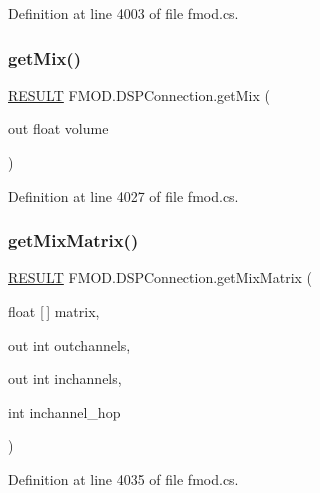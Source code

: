 Definition at line 4003 of file fmod.\+cs.

\mbox{\label{class_f_m_o_d_1_1_d_s_p_connection_a4eca6c02444348f52dde8838376a2ee3}} 
\subsubsection{\texorpdfstring{get\+Mix()}{getMix()}}
{\footnotesize\ttfamily \hyperlink{namespace_f_m_o_d_a305d1176ef3f8c8815861a60407ac33d}{R\+E\+S\+U\+LT} F\+M\+O\+D.\+D\+S\+P\+Connection.\+get\+Mix (\begin{DoxyParamCaption}\item[{out float}]{volume }\end{DoxyParamCaption})}



Definition at line 4027 of file fmod.\+cs.

\mbox{\label{class_f_m_o_d_1_1_d_s_p_connection_ac6795f09bd1fff01d2226b2abb1fe267}} 
\subsubsection{\texorpdfstring{get\+Mix\+Matrix()}{getMixMatrix()}}
{\footnotesize\ttfamily \hyperlink{namespace_f_m_o_d_a305d1176ef3f8c8815861a60407ac33d}{R\+E\+S\+U\+LT} F\+M\+O\+D.\+D\+S\+P\+Connection.\+get\+Mix\+Matrix (\begin{DoxyParamCaption}\item[{float \mbox{[}$\,$\mbox{]}}]{matrix,  }\item[{out int}]{outchannels,  }\item[{out int}]{inchannels,  }\item[{int}]{inchannel\+\_\+hop }\end{DoxyParamCaption})}



Definition at line 4035 of file fmod.\+cs.

\mbox{\label{class_f_m_o_d_1_1_d_s_p_connection_ae9ffe554de56860006e2f8e16f101de9}} 

